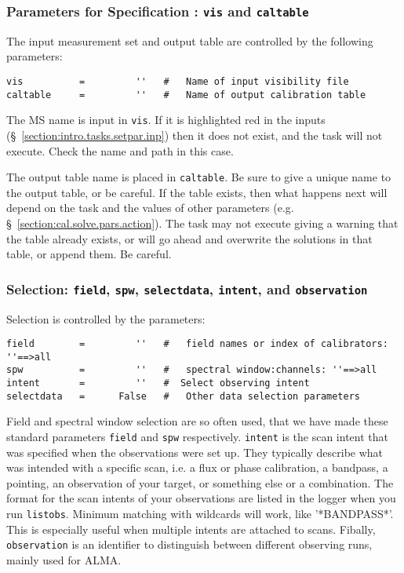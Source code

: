 {%
\subsubsection{Parameters for Specification : {\tt vis} and
{\tt caltable} }
\label{section:cal.solve.pars.spec}

The input measurement set and output table are
controlled by the following parameters:
\small
\begin{verbatim}
vis          =         ''   #   Name of input visibility file
caltable     =         ''   #   Name of output calibration table
\end{verbatim}
\normalsize

The MS name is input in {\tt vis}.  If it is highlighted red
in the inputs (\S~\ref{section:intro.tasks.setpar.inp}) then it 
does not exist, and the task will not execute.  Check the name and
path in this case. 

The output table name is placed in {\tt caltable}.  Be sure to give a
unique name to the output table, or be careful.  If the table exists,
then what happens next will depend on the task and the values of other
parameters (e.g.  \S~\ref{section:cal.solve.pars.action}).  The task
may not execute giving a warning that the table already exists, or
will go ahead and overwrite the solutions in that table, or append
them.  Be careful.

\subsubsection{Selection: {\tt field}, {\tt spw}, {\tt selectdata},
  {\tt intent}, and {\tt observation} }
\label{section:cal.solve.pars.select}

Selection is controlled by the parameters:
\small
\begin{verbatim}
field        =         ''   #   field names or index of calibrators: ''==>all
spw          =         ''   #   spectral window:channels: ''==>all 
intent       =         ''   #  Select observing intent
selectdata   =      False   #   Other data selection parameters
\end{verbatim}
\normalsize

Field and spectral window selection are so often used, that we have
made these standard parameters {\tt field} and {\tt spw}
respectively. {\tt intent} is the scan intent that was specified when
the observations were set up. They typically describe what was
intended with a specific scan, i.e. a flux or phase calibration, a
bandpass, a pointing, an observation of your target, or something else
or a combination. The format for the scan intents of your observations
are listed in the logger when you run {\tt listobs}. Minimum matching
with wildcards will work, like '*BANDPASS*'. This is especially useful
when multiple intents are attached to scans.  Fibally, {\tt
  observation} is an identifier to distinguish between different
observing runs, mainly used for ALMA.

}
